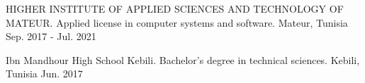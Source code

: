 

\begin{cventries}

  \cventry
  {HIGHER INSTITUTE OF APPLIED SCIENCES AND TECHNOLOGY OF MATEUR.} %
    {Applied license in computer systems and software.} %
    {Mateur, Tunisia} %
    {Sep. 2017 - Jul. 2021} %
    {}

    \cventry
    {Ibn Mandhour High School Kebili.} %
      {Bachelor's degree in technical sciences.} %
      {Kebili, Tunisia} %
      {Jun. 2017} %
      {}

\end{cventries}
